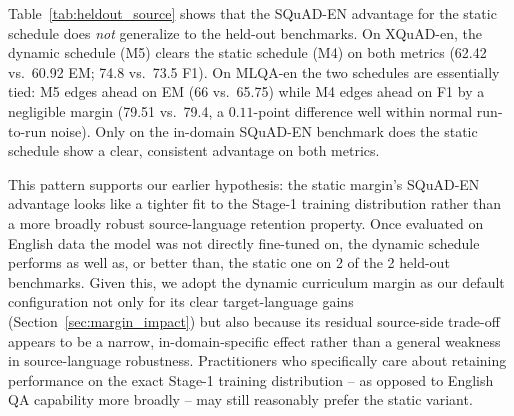 \documentclass[11pt]{article}
\begin{document}
\begin{table}[H]
\centering
\small
{}
\caption{Source-language performance under the static (M4) vs.\ dynamic (M5) margin schedule, comparing the in-domain SQuAD-EN benchmark against two held-out English benchmarks that share the exact same questions as the XQuAD-vi/MLQA-vi transfer targets.}
\label{tab:heldout_source}
\end{table}

Table~\ref{tab:heldout_source} shows that the SQuAD-EN advantage for the static schedule does \emph{not} generalize to the held-out benchmarks. On XQuAD-en, the dynamic schedule (M5) clears the static schedule (M4) on both metrics (62.42 vs.\ 60.92 EM; 74.8 vs.\ 73.5 F1). On MLQA-en the two schedules are essentially tied: M5 edges ahead on EM (66 vs.\ 65.75) while M4 edges ahead on F1 by a negligible margin (79.51 vs.\ 79.4, a $0.11$-point difference well within normal run-to-run noise). Only on the in-domain SQuAD-EN benchmark does the static schedule show a clear, consistent advantage on both metrics.

This pattern supports our earlier hypothesis: the static margin's SQuAD-EN advantage looks like a tighter fit to the Stage-1 training distribution rather than a more broadly robust source-language retention property. Once evaluated on English data the model was not directly fine-tuned on, the dynamic schedule performs as well as, or better than, the static one on 2 of the 2 held-out benchmarks. Given this, we adopt the dynamic curriculum margin as our default configuration not only for its clear target-language gains (Section~\ref{sec:margin_impact}) but also because its residual source-side trade-off appears to be a narrow, in-domain-specific effect rather than a general weakness in source-language robustness. Practitioners who specifically care about retaining performance on the exact Stage-1 training distribution -- as opposed to English QA capability more broadly -- may still reasonably prefer the static variant.
\end{document}
